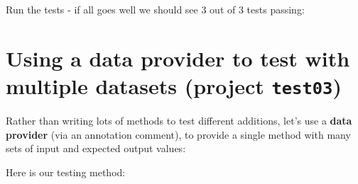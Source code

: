 \documentclass[a4paperpaper,openright]{book}
\newenvironment{Shaded}{}{}
\newcommand{\AnnotationTok}[1]{\textcolor[rgb]{0.38,0.63,0.69}{\textbf{\textit{#1}}}}
\newcommand{\CommentTok}[1]{\textcolor[rgb]{0.38,0.63,0.69}{\textit{#1}}}
\newcommand{\ExtensionTok}[1]{#1}
\newcommand{\KeywordTok}[1]{\textcolor[rgb]{0.00,0.44,0.13}{\textbf{#1}}}
\newcommand{\NormalTok}[1]{#1}
\newcommand{\OtherTok}[1]{\textcolor[rgb]{0.00,0.44,0.13}{#1}}
\begin{document}
Run the tests - if all goes well we should see 3 out of 3 tests passing:

\begin{Shaded}
\end{Shaded}

\hypertarget{using-a-data-provider-to-test-with-multiple-datasets-project-test03}{%
\section{\texorpdfstring{Using a data provider to test with multiple
datasets (project
\texttt{test03})}{Using a data provider to test with multiple datasets (project test03)}}\label{using-a-data-provider-to-test-with-multiple-datasets-project-test03}}

Rather than writing lots of methods to test different additions, let's
use a \textbf{data provider} (via an annotation comment), to provide a
single method with many sets of input and expected output values:

Here is our testing method:

\begin{Shaded}
\end{Shaded}
\end{document}
